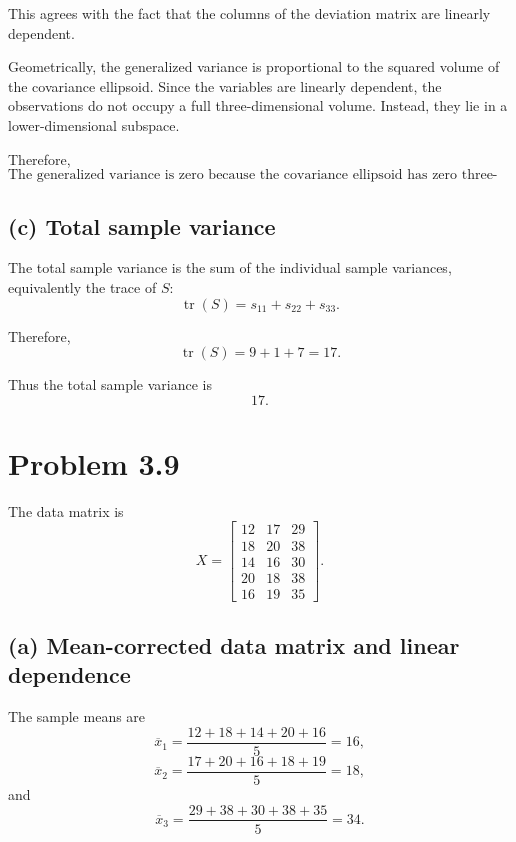 \documentclass[12pt,a4paper]{article}
\begin{document}
This agrees with the fact that the columns of the deviation matrix are linearly dependent.

Geometrically, the generalized variance is proportional to the squared volume of the covariance ellipsoid. Since the variables are linearly dependent, the observations do not occupy a full three-dimensional volume. Instead, they lie in a lower-dimensional subspace.

Therefore,
\[
\boxed{\text{The generalized variance is zero because the covariance ellipsoid has zero three-dimensional volume.}}
\]

\subsection*{(c) Total sample variance}

The total sample variance is the sum of the individual sample variances, equivalently the trace of \(S\):
\[
\operatorname{tr}(S)
=
s_{11}+s_{22}+s_{33}.
\]

Therefore,
\[
\operatorname{tr}(S)
=
9+1+7
=
\boxed{17}.
\]

Thus the total sample variance is
\[
\boxed{17}.
\]

\newpage
\section{Problem 3.9}

The data matrix is
\[
X=
\begin{bmatrix}
12&17&29\\
18&20&38\\
14&16&30\\
20&18&38\\
16&19&35
\end{bmatrix}.
\]

\subsection*{(a) Mean-corrected data matrix and linear dependence}

The sample means are
\[
\overline{x}_1
=
\frac{12+18+14+20+16}{5}
=
16,
\]
\[
\overline{x}_2
=
\frac{17+20+16+18+19}{5}
=
18,
\]
and
\[
\overline{x}_3
=
\frac{29+38+30+38+35}{5}
=
34.
\]
\end{document}
